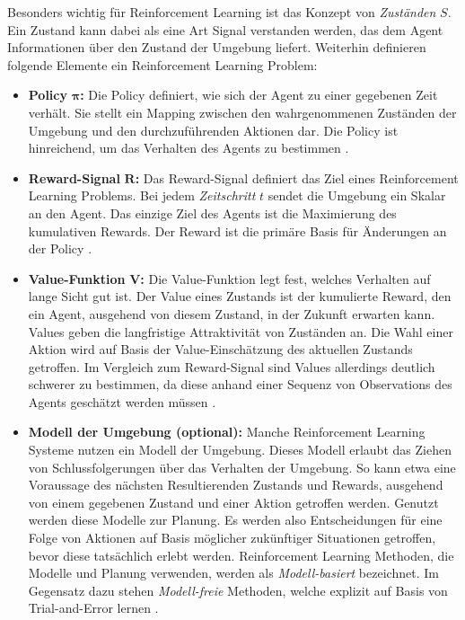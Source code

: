 Besonders wichtig für Reinforcement Learning ist das Konzept von \emph{Zuständen} $S$.
Ein Zustand kann dabei als eine Art Signal verstanden werden, das dem Agent Informationen über den Zustand der Umgebung liefert.
Weiterhin definieren folgende Elemente ein Reinforcement Learning Problem:
\begin{itemize}
    \item \textbf{Policy} $\mathbf{\pi}$\textbf{:}
    Die Policy definiert, wie sich der Agent zu einer gegebenen Zeit verhält.
    Sie stellt ein Mapping zwischen den wahrgenommenen Zuständen der Umgebung und den durchzuführenden Aktionen dar.
    Die Policy ist hinreichend, um das Verhalten des Agents zu bestimmen \cite[6]{sutton2018rlintro}.

    \item \textbf{Reward-Signal} $\mathbf{R}$\textbf{:}
    Das Reward-Signal definiert das Ziel eines Reinforcement Learning Problems.
    Bei jedem \emph{Zeitschritt} $t$ sendet die Umgebung ein Skalar an den Agent.
    Das einzige Ziel des Agents ist die Maximierung des kumulativen Rewards.
    Der Reward ist die primäre Basis für Änderungen an der Policy \cite[6]{sutton2018rlintro}.

    \item \textbf{Value-Funktion} $\mathbf{V}$\textbf{:}
    Die Value-Funktion legt fest, welches Verhalten auf lange Sicht gut ist.
    Der Value eines Zustands ist der kumulierte Reward, den ein Agent, ausgehend von diesem Zustand, in der Zukunft erwarten kann.
    Values geben die langfristige Attraktivität von Zuständen an.
    Die Wahl einer Aktion wird auf Basis der Value-Einschätzung des aktuellen Zustands getroffen.
    Im Vergleich zum Reward-Signal sind Values allerdings deutlich schwerer zu bestimmen, da diese anhand einer Sequenz von Observations des Agents geschätzt werden müssen \cite[6]{sutton2018rlintro}.

    \item \textbf{Modell der Umgebung (optional):}
    Manche Reinforcement Learning Systeme nutzen ein Modell der Umgebung.
    Dieses Modell erlaubt das Ziehen von Schlussfolgerungen über das Verhalten der Umgebung.
    So kann etwa eine Voraussage des nächsten Resultierenden Zustands und Rewards, ausgehend von einem gegebenen Zustand und einer Aktion getroffen werden.
    Genutzt werden diese Modelle zur Planung.
    Es werden also Entscheidungen für eine Folge von Aktionen auf Basis möglicher zukünftiger Situationen getroffen, bevor diese tatsächlich erlebt werden.
    Reinforcement Learning Methoden, die Modelle und Planung verwenden, werden als \emph{Modell-basiert} bezeichnet.
    Im Gegensatz dazu stehen \emph{Modell-freie} Methoden, welche explizit auf Basis von Trial-and-Error lernen \cite[7]{sutton2018rlintro}.
\end{itemize}

